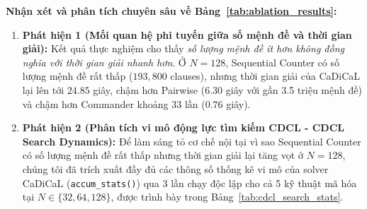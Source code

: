\documentclass[a4paper,fleqn]{cas-sc}
\begin{document}
\textbf{Nhận xét và phân tích chuyên sâu về Bảng~\ref{tab:ablation_results}:}
\begin{enumerate}
    \item \textbf{Phát hiện 1 (Mối quan hệ phi tuyến giữa số mệnh đề và thời gian giải):} Kết quả thực nghiệm cho thấy \textit{số lượng mệnh đề ít hơn không đồng nghĩa với thời gian giải nhanh hơn}. Ở $N=128$, Sequential Counter có số lượng mệnh đề rất thấp ($193{,}800$ clauses), nhưng thời gian giải của CaDiCaL lại lên tới $24.85$ giây, chậm hơn Pairwise ($6.30$ giây với gần 3.5 triệu mệnh đề) và chậm hơn Commander khoảng 33 lần ($0.76$ giây).
    \item \textbf{Phát hiện 2 (Phân tích vi mô động lực tìm kiếm CDCL - CDCL Search Dynamics):} 
    Để làm sáng tỏ cơ chế nội tại vì sao Sequential Counter có số lượng mệnh đề rất thấp nhưng thời gian giải lại tăng vọt ở $N=128$, chúng tôi đã trích xuất đầy đủ các thông số thống kê vi mô của solver CaDiCaL (\texttt{accum\_stats()}) qua 3 lần chạy độc lập cho cả 5 kỹ thuật mã hóa tại $N \in \{32, 64, 128\}$, được trình bày trong Bảng~\ref{tab:cdcl_search_stats}.


\end{enumerate}
\end{document}
